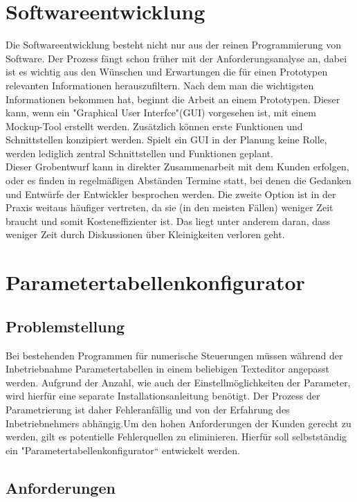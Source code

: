 \documentclass[10pt,a4paper]{article}
\begin{document}
\section{Softwareentwicklung}
Die Softwareentwicklung besteht nicht nur aus der reinen Programmierung von Software. Der Prozess fängt schon früher mit der Anforderungsanalyse an, dabei ist es wichtig aus den Wünschen und Erwartungen die für einen Prototypen relevanten Informationen herauszufiltern. Nach dem man die wichtigsten Informationen bekommen hat, beginnt die Arbeit an einem Prototypen. Dieser kann, wenn ein "Graphical User Interfce"(GUI) vorgesehen ist, mit einem Mockup-Tool erstellt werden. Zusätzlich können erste Funktionen und  Schnittstellen konzipiert werden. Spielt ein GUI in der Planung keine Rolle, werden lediglich zentral Schnittstellen und Funktionen geplant. \\Dieser Grobentwurf kann in direkter Zusammenarbeit mit dem Kunden erfolgen, oder es finden in regelmäßigen Abständen Termine statt, bei denen die Gedanken und Entwürfe der Entwickler besprochen werden. Die zweite Option ist in der Praxis weitaus häufiger vertreten, da sie (in den meisten Fällen) weniger Zeit braucht und somit Kosteneffizienter ist. Das liegt unter anderem daran, dass weniger Zeit durch Diskussionen über Kleinigkeiten verloren geht.
\section{Parametertabellenkonfigurator}
\subsection{Problemstellung}
Bei bestehenden Programmen für numerische Steuerungen müssen während der Inbetriebnahme Parametertabellen in einem beliebigen Texteditor angepasst werden. Aufgrund der Anzahl, wie auch der Einstellmöglichkeiten der Parameter, wird hierfür eine separate Installationsanleitung benötigt. Der Prozess der Parametrierung ist daher Fehleranfällig und von der Erfahrung des Inbetriebnehmers abhängig.Um den hohen Anforderungen der Kunden gerecht zu werden, gilt es potentielle Fehlerquellen zu eliminieren. Hierfür soll selbstständig ein "Parametertabellenkonfigurator“ entwickelt werden.\newpage
\subsection{Anforderungen}
 
\end{document}
